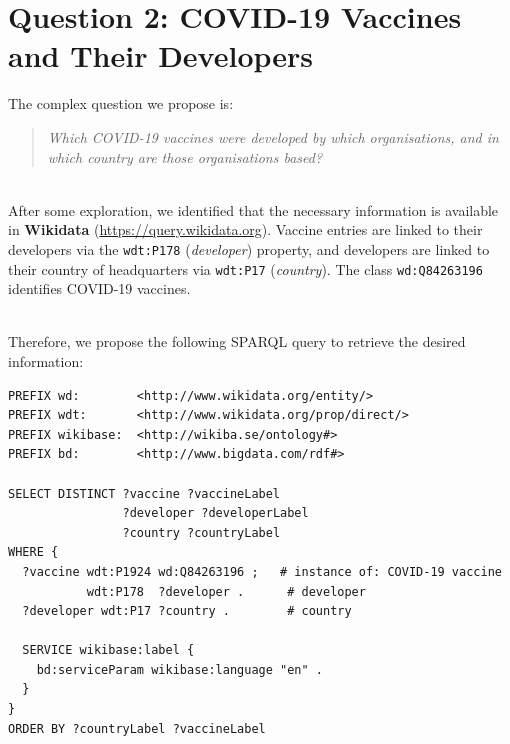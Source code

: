 \documentclass[12pt,a4paper]{article}
\begin{document}
\section{Question 2: COVID-19 Vaccines and Their Developers}
\label{sec:q2}

The complex question we propose is:
\begin{quote}
\textit{Which COVID-19 vaccines were developed by which organisations, and
in which country are those organisations based?}
\end{quote}

\text{ }\\
After some exploration, we identified that the necessary information is available in
\textbf{Wikidata} (\url{https://query.wikidata.org}).
Vaccine entries are linked to their developers via the \texttt{wdt:P178} (\emph{developer}) 
property, and developers are linked to their country of headquarters via
\texttt{wdt:P17} (\emph{country}). The class \texttt{wd:Q84263196} identifies COVID-19 vaccines.


\text{ }\\
Therefore, we propose the following SPARQL query to retrieve the desired information:
\begin{lstlisting}[caption={Wikidata SPARQL query for COVID-19 vaccine developers.},
                   label={lst:q2}]
PREFIX wd:        <http://www.wikidata.org/entity/>
PREFIX wdt:       <http://www.wikidata.org/prop/direct/>
PREFIX wikibase:  <http://wikiba.se/ontology#>
PREFIX bd:        <http://www.bigdata.com/rdf#>

SELECT DISTINCT ?vaccine ?vaccineLabel
                ?developer ?developerLabel
                ?country ?countryLabel
WHERE {
  ?vaccine wdt:P1924 wd:Q84263196 ;   # instance of: COVID-19 vaccine
           wdt:P178  ?developer .      # developer
  ?developer wdt:P17 ?country .        # country

  SERVICE wikibase:label {
    bd:serviceParam wikibase:language "en" .
  }
}
ORDER BY ?countryLabel ?vaccineLabel
\end{lstlisting}
\end{document}
